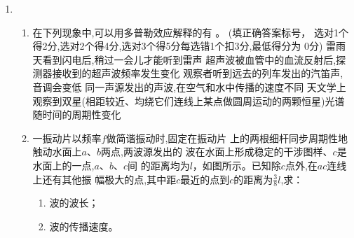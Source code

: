 \begin{enumerate}
\begin{enumerate}




\end{enumerate}







\newpage
{}


\item 
\begin{enumerate}
\item
在下列现象中,可以用多普勒效应解释的有 \underlinegap 。
(填正确答案标号，
选对1个得2分,选对2个得4分,选对3个得5分每选错1个扣3分,最低得分为
0分)
\fivechoices
{雷雨天看到闪电后,稍过一会儿才能听到雷声}
{超声波被血管中的血流反射后,探测器接收到的超声波频率发生变化}
{观察者听到远去的列车发出的汽笛声,音调会变低}
{同一声源发出的声波,在空气和水中传播的速度不同}
{天文学上观察到双星(相距较近、均绕它们连线上某点做圆周运动的两颗恒星)光谱随时间的周期性变化}




\item 
一振动片以频率$ f $做简谐振动时,固定在振动片
上的两根细杆同步周期性地触动水面上$ a $、$ b $两点,两波源发出的
波在水面上形成稳定的干涉图样、$ c $是水面上的一点,$ a $、$ b $、$ c $间
的距离均为$ l $，如图所示。已知除$ c $点外,在$ ac $连线上还有其他振
幅极大的点,其中距$ c $最近的点到$ c $的距离为$ \frac{ 3 }{ 8 } l $,求：
\begin{enumerate}
\item
波的波长；

\item 
波的传播速度。

\end{enumerate}
\begin{figure}[h!]
\flushright

\end{figure}





\end{enumerate}




\end{enumerate}



